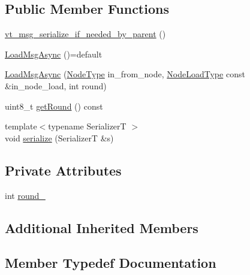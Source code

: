\subsection*{Public Member Functions}
\begin{DoxyCompactItemize}
\item 
\hyperlink{structvt_1_1vrt_1_1collection_1_1balance_1_1_load_msg_async_ab3a289a0f86f459ffa0e20a52581a0a3}{vt\+\_\+msg\+\_\+serialize\+\_\+if\+\_\+needed\+\_\+by\+\_\+parent} ()
\item 
\hyperlink{structvt_1_1vrt_1_1collection_1_1balance_1_1_load_msg_async_a91dc073228c69d6bccb3ef7a405ac8a9}{Load\+Msg\+Async} ()=default
\item 
\hyperlink{structvt_1_1vrt_1_1collection_1_1balance_1_1_load_msg_async_af40c4eda8057beeef2f027f2bd8eebe9}{Load\+Msg\+Async} (\hyperlink{namespacevt_a866da9d0efc19c0a1ce79e9e492f47e2}{Node\+Type} in\+\_\+from\+\_\+node, \hyperlink{structvt_1_1vrt_1_1collection_1_1balance_1_1_load_msg_a65e300c2d6119d11e9121b17f7f94850}{Node\+Load\+Type} const \&in\+\_\+node\+\_\+load, int round)
\item 
uint8\+\_\+t \hyperlink{structvt_1_1vrt_1_1collection_1_1balance_1_1_load_msg_async_a3472cc2414cd4bcca116cdc6432f534c}{get\+Round} () const
\item 
{\footnotesize template$<$typename SerializerT $>$ }\\void \hyperlink{structvt_1_1vrt_1_1collection_1_1balance_1_1_load_msg_async_a4c484a8f9f5537166435f832bfedb708}{serialize} (SerializerT \&s)
\end{DoxyCompactItemize}
\subsection*{Private Attributes}
\begin{DoxyCompactItemize}
\item 
int \hyperlink{structvt_1_1vrt_1_1collection_1_1balance_1_1_load_msg_async_adc179114938252d9cd0c7664b94887ee}{round\+\_\+}
\end{DoxyCompactItemize}
\subsection*{Additional Inherited Members}


\subsection{Member Typedef Documentation}
\mbox{\label{structvt_1_1vrt_1_1collection_1_1balance_1_1_load_msg_async_a6581fa4f51cc442179e9aba1fd3e3bee}} 
